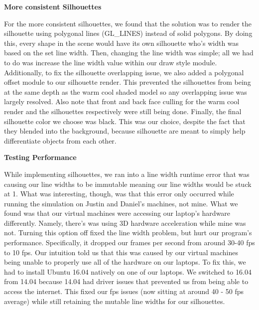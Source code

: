 \documentclass[10pt,journal,compsoc,draftclsnofoot]{IEEEtran}
\begin{document}
\begin{flushleft}
\textbf{More consistent Silhouettes}
\par
For the more consistent silhouettes, we found that the solution was to render the silhouette using polygonal lines (GL\_LINES) instead of solid polygons.
By doing this, every shape in the scene would have its own silhouette who's width was based on the set line width.
Then, changing the line width was simple; all we had to do was increase the line width value within our draw style module.
Additionally, to fix the silhouette overlapping issue, we also added a polygonal offset module to our silhouette render. 
This prevented the silhouettes from being at the same depth as the warm cool shaded model so any overlapping issue was largely resolved.
Also note that front and back face culling for the warm cool render and the silhouettes respectively were still being done.
Finally, the final silhouette color we choose was black.
This was our choice, despite the fact that they blended into the background, because silhouette are meant to simply help differentiate objects from each other.
\vspace{3mm}

\newpage

\textbf{Testing Performance}
\par
While implementing silhouettes, we ran into a line width runtime error that was causing our line widths to be immutable meaning our line widths would be stuck at 1.
What was interesting, though, was that this error only occurred while running the simulation on Justin and Daniel's machines, not mine.
What we found was that our virtual machines were accessing our laptop's hardware differently.
Namely, there's was using 3D hardware acceleration while mine was not.
Turning this option off fixed the line width problem, but hurt our program's performance.
Specifically, it dropped our frames per second from around 30-40 fps to 10 fps.
Our intuition told us that this was caused by our virtual machines being unable to properly use all of the hardware on our laptops.
To fix this, we had to install Ubuntu 16.04 natively on one of our laptops.
We switched to 16.04 from 14.04 because 14.04 had driver issues that prevented us from being able to access the internet.
This fixed our fps issues (now sitting at around 40 - 50 fps average) while still retaining the mutable line widths for our silhouettes.
\newpage


\end{flushleft}
\end{document}
